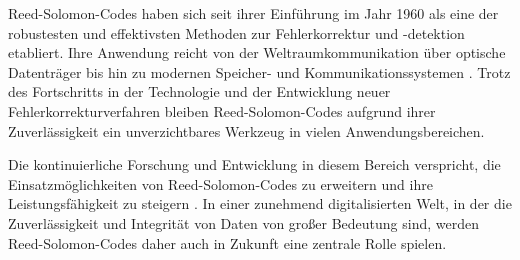 Reed-Solomon-Codes haben sich seit ihrer Einführung im Jahr 1960 als eine der robustesten und effektivsten Methoden zur Fehlerkorrektur und -detektion etabliert. 
Ihre Anwendung reicht von der Weltraumkommunikation über optische Datenträger bis hin zu modernen Speicher- und Kommunikationssystemen \cite{wickerReedSolomonCodes1994}. 
Trotz des Fortschritts in der Technologie und der Entwicklung neuer Fehlerkorrekturverfahren bleiben Reed-Solomon-Codes aufgrund ihrer Zuverlässigkeit ein unverzichtbares Werkzeug in vielen Anwendungsbereichen.

Die kontinuierliche Forschung und Entwicklung in diesem Bereich verspricht, die Einsatzmöglichkeiten von Reed-Solomon-Codes zu erweitern und ihre Leistungsfähigkeit zu steigern \cite{conOptimalTwoDimensionalReed2024, sippelReedSolomonCodes2019}. 
In einer zunehmend digitalisierten Welt, in der die Zuverlässigkeit und Integrität von Daten von großer Bedeutung sind, werden Reed-Solomon-Codes daher auch in Zukunft eine zentrale Rolle spielen.